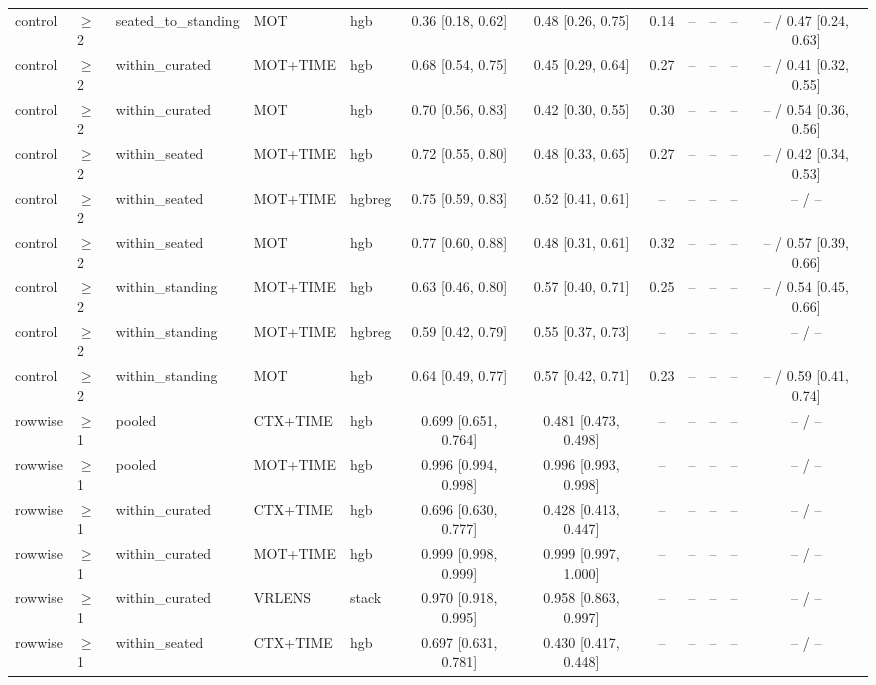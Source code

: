 \begin{longtable}{@{}lllllcccrrrc@{}}
control & $\geq$2 & seated\_to\_standing & MOT & hgb & 0.36 [0.18, 0.62] & 0.48 [0.26, 0.75] & 0.14 & -- & -- & -- & -- / 0.47 [0.24, 0.63] \\
control & $\geq$2 & within\_curated & MOT+TIME & hgb & 0.68 [0.54, 0.75] & 0.45 [0.29, 0.64] & 0.27 & -- & -- & -- & -- / 0.41 [0.32, 0.55] \\
control & $\geq$2 & within\_curated & MOT & hgb & 0.70 [0.56, 0.83] & 0.42 [0.30, 0.55] & 0.30 & -- & -- & -- & -- / 0.54 [0.36, 0.56] \\
control & $\geq$2 & within\_seated & MOT+TIME & hgb & 0.72 [0.55, 0.80] & 0.48 [0.33, 0.65] & 0.27 & -- & -- & -- & -- / 0.42 [0.34, 0.53] \\
control & $\geq$2 & within\_seated & MOT+TIME & hgbreg & 0.75 [0.59, 0.83] & 0.52 [0.41, 0.61] & -- & -- & -- & -- & -- / -- \\
control & $\geq$2 & within\_seated & MOT & hgb & 0.77 [0.60, 0.88] & 0.48 [0.31, 0.61] & 0.32 & -- & -- & -- & -- / 0.57 [0.39, 0.66] \\
control & $\geq$2 & within\_standing & MOT+TIME & hgb & 0.63 [0.46, 0.80] & 0.57 [0.40, 0.71] & 0.25 & -- & -- & -- & -- / 0.54 [0.45, 0.66] \\
control & $\geq$2 & within\_standing & MOT+TIME & hgbreg & 0.59 [0.42, 0.79] & 0.55 [0.37, 0.73] & -- & -- & -- & -- & -- / -- \\
control & $\geq$2 & within\_standing & MOT & hgb & 0.64 [0.49, 0.77] & 0.57 [0.42, 0.71] & 0.23 & -- & -- & -- & -- / 0.59 [0.41, 0.74] \\
rowwise & $\geq$1 & pooled & CTX+TIME & hgb & 0.699 [0.651, 0.764] & 0.481 [0.473, 0.498] & -- & -- & -- & -- & -- / -- \\
rowwise & $\geq$1 & pooled & MOT+TIME & hgb & 0.996 [0.994, 0.998] & 0.996 [0.993, 0.998] & -- & -- & -- & -- & -- / -- \\
rowwise & $\geq$1 & within\_curated & CTX+TIME & hgb & 0.696 [0.630, 0.777] & 0.428 [0.413, 0.447] & -- & -- & -- & -- & -- / -- \\
rowwise & $\geq$1 & within\_curated & MOT+TIME & hgb & 0.999 [0.998, 0.999] & 0.999 [0.997, 1.000] & -- & -- & -- & -- & -- / -- \\
rowwise & $\geq$1 & within\_curated & VRLENS & stack & 0.970 [0.918, 0.995] & 0.958 [0.863, 0.997] & -- & -- & -- & -- & -- / -- \\
rowwise & $\geq$1 & within\_seated & CTX+TIME & hgb & 0.697 [0.631, 0.781] & 0.430 [0.417, 0.448] & -- & -- & -- & -- & -- / -- \\

\end{longtable}
